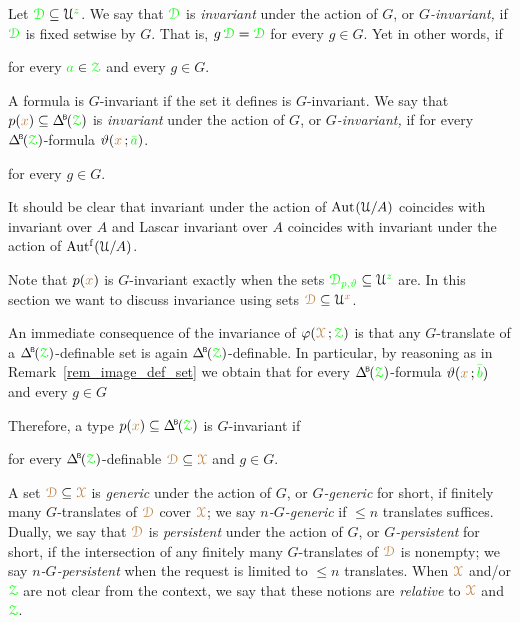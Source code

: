 Let ${\color{green}\EuScript D}\subseteq\EuScript U^{\color{green} z}$.
We say that ${\color{green}\EuScript D}$ is \emph{invariant\/} under the action of $G$, or \emph{$G$-invariant,} if  ${\color{green}\EuScript D}$ is fixed setwise by $G$.
That is, $g\,{\color{green}\EuScript D}={\color{green}\EuScript D}$ for every $g\in G$.
Yet in other words, if

\hfill for every ${\color{green} a}\in{\color{green}\EuScript Z}$ and every $g\in G$.

A formula is $G$-invariant if the set it defines is $G$-invariant.
We say that $p({\mr x})\subseteq\BDelta(\grZ)$ is \emph{invariant\/} under the action of $G$, or \emph{$G$-invariant,} if for every $\BDelta(\grZ)$-formula $\vartheta({\color{brown} x}\,;{\color{green}\bar a})$. 

\hfill for every $g\in G$.

It should be clear that invariant under the action of ${\rm Aut\kern.15ex}(\EuScript U/A)$ coincides with invariant over $A$ and Lascar invariant over $A$ coincides with invariant under the action of $\mbox{Aut$^{\rm f}$}(\EuScript U/A)$.

Note that $p({\color{brown} x})$ is $G$-invariant exactly when the sets ${\color{green}\EuScript D_{p,\vartheta}}\subseteq\EuScript U^{\color{green} z}$ are.
In this section we want to discuss invariance using sets ${\color{brown}\EuScript D}\subseteq\EuScript U^{\color{brown} x}$.

An immediate consequence of the invariance of $\varphi({\color{brown}\EuScript X}\,;{\color{green}\EuScript Z})$ is that any $G$-translate of a $\BDelta({\grZ})$-definable set is again $\BDelta({\grZ})$-definable.
In particular, by reasoning as in Remark~\ref{rem_image_def_set} we obtain that for every $\BDelta({\grZ})$-formula $\vartheta({\color{brown} x}\,;{\color{green}\bar b})$ and every $g\in G$


Therefore, a type $p({\mr x})\subseteq\BDelta(\grZ)$ is $G$-invariant if

\hfill for every $\BDelta({\grZ})$-definable ${\color{brown}\EuScript D}\subseteq{\color{brown}\EuScript X}$ and $g\in G$.


A set ${\color{brown}\EuScript D}\subseteq{\color{brown}\EuScript X}$ is \emph{generic\/} under the action of $G$, or \emph{$G$-generic\/} for short, if finitely many $G$-translates of ${\color{brown}\EuScript D}$ cover ${\color{brown}\EuScript X}$; we say \emph{$n$-$G$-generic\/} if $\le n$ translates suffices.
Dually, we say that ${\color{brown}\EuScript D}$ is \emph{persistent\/} under the action of $G$, or \emph{$G$-persistent\/} for short, if the intersection of any finitely many $G$-translates of ${\color{brown}\EuScript D}$ is nonempty; we say \emph{$n$-$G$-persistent\/} when the request is limited to $\le n$ translates.
When ${\color{brown}\EuScript X}$ and/or ${\color{green}\EuScript Z}$ are not clear from the context, we say that these notions are \emph{relative\/} to ${\color{brown}\EuScript X}$ and ${\color{green}\EuScript Z}$.

